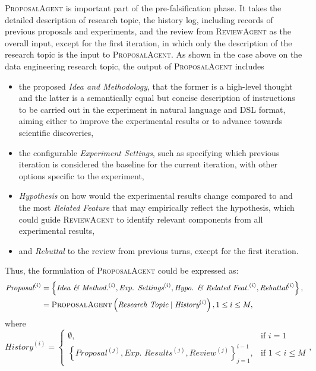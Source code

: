 \documentclass{article} %
\newcommand{\ProposalAgent}{\textsc{ProposalAgent}\xspace}
\newcommand{\ReviewAgent}{\textsc{ReviewAgent}\xspace}
\newcommand{\DSL}{\textsc{DSL}\xspace}
\begin{document}
\ProposalAgent is important part of the pre-falsification phase. It takes the detailed description of research topic, the history log, including records of previous proposals and experiments, and the review from \ReviewAgent as the overall input, except for the first iteration, in which only the description of the research topic is the input to \ProposalAgent. 
As shown in the case above on the data engineering research topic, the output of \ProposalAgent includes 
\begin{itemize}
    \item the proposed \textit{Idea and Methodology}, that the former is a high-level thought and the latter is a semantically equal but concise description of instructions to be carried out in the experiment in natural language and \DSL format, aiming either to improve the experimental results or to advance towards scientific discoveries, 
    \item the configurable \textit{Experiment Settings}, such as specifying which previous iteration is considered the baseline for the current iteration, with other options specific to the experiment, 
    \item \textit{Hypothesis} on how would the experimental results change compared to and the most \textit{Related Feature} that may empirically reflect the hypothesis, which could guide \ReviewAgent to identify relevant components from all experimental results, 
    \item and \textit{Rebuttal} to the review from previous turns, except for the first iteration.
\end{itemize}
Thus, the formulation of \ProposalAgent could be expressed as:
\begin{equation}
\begin{aligned}
\textit{Proposal}^{(i)} &= \left\{\textit{Idea \& Method.}^{(i)}, \textit{Exp. Settings}^{(i)}, \textit{Hypo. \& Related Feat.}^{(i)}, \textit{Rebuttal}^{(i)}\right\}, \\
   & = \text{\ProposalAgent}\left(\textit{Research Topic} \mid \textit{History}^{(i)}\right), 1 \leq i \leq M, 
\end{aligned}
\end{equation}
where
\begin{equation}
\textit{History}^{(i)} = \begin{cases} 
\emptyset, & \text{if } i = 1 \\ 
\left\{\textit{Proposal}^{(j)}, \textit{Exp. Results}^{(j)}, \textit{Review}^{(j)} \right\}_{j=1}^{i-1}, & \text{if } 1 < i \leq M 
\end{cases},
\end{equation}
\end{document}
